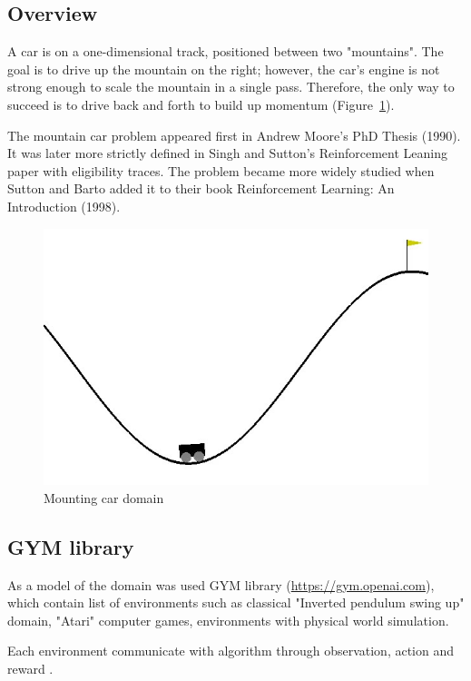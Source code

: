 \documentclass[12pt]{article}
\begin{document}
\subsection{Overview}{A car is on a one-dimensional track, positioned between two "mountains". The goal is to drive up the mountain on the right; however, the car's engine is not strong enough to scale the mountain in a single pass. Therefore, the only way to succeed is to drive back and forth to build up momentum (Figure~\ref{domain_image}).\par
The mountain car problem appeared first in Andrew Moore's PhD Thesis (1990). It was later more strictly defined in Singh and Sutton's Reinforcement Leaning paper with eligibility traces. The problem became more widely studied when Sutton and Barto added it to their book Reinforcement Learning: An Introduction (1998).\par
\begin{figure}[h!]
\begin{center}
\includegraphics[scale=0.5]{images/domain.jpg}
\end{center}
\caption{Mounting car domain}
\label{domain_image}
\end{figure}
}
\subsection{GYM library}{
As a model of the domain was used GYM library (\url{https://gym.openai.com}), which contain list of environments such as classical "Inverted pendulum swing up" domain, "Atari" computer games, environments with physical world simulation.\par
Each environment communicate with algorithm through observation, action and reward .}
\end{document}
